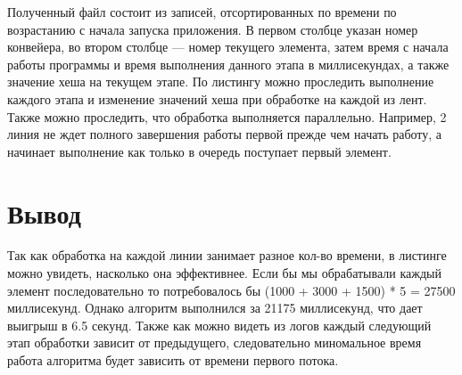 Полученный файл состоит из записей, отсортированных по времени по возрастанию с начала запуска приложения. В первом столбце указан номер конвейера, во втором столбце  — номер текущего элемента, затем время с начала работы программы и время выполнения данного этапа в миллисекундах, а также значение хеша на текущем этапе.
По листингу можно проследить выполнение каждого этапа и изменение значений хеша при обработке на каждой из лент. Также можно проследить, что обработка выполняется параллельно. Например, 2 линия не ждет полного завершения работы первой прежде чем начать работу, а начинает выполнение как только в очередь поступает первый элемент.

\section{Вывод}
Так как обработка на каждой линии занимает разное кол-во времени, в листинге можно увидеть, насколько она эффективнее. Если бы мы обрабатывали каждый элемент последовательно то потребовалось бы (1000 + 3000 + 1500) * 5 = 27500 миллисекунд. Однако алгоритм выполнился за 21175 миллисекунд, что дает выигрыш в 6.5 секунд. 
Также как можно видеть из логов каждый следующий этап обработки зависит от предыдущего, следовательно миномальное время работа алгоритма будет зависить от времени первого потока.